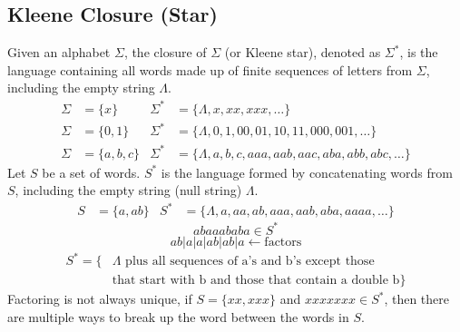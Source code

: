 \subsection{Kleene Closure (Star)}
Given an alphabet \(\Sigma\), the closure of \(\Sigma\) (or Kleene star), denoted as \(\Sigma^*\), is the language containing all words made up of finite sequences of letters from \(\Sigma\), including the empty string \(\Lambda\).
\begin{align*}
    \Sigma&=\{x\} & \Sigma^*&=\{\Lambda, x, xx, xxx,\ldots\}\\
    \Sigma&=\{0,1\} & \Sigma^*&=\{\Lambda,0,1,00,01,10,11,000,001,\ldots\}\\
    \Sigma&=\{a,b,c\} & \Sigma^*&=\{\Lambda,a,b,c,aaa,aab,aac,aba,abb,abc,\ldots\}
\end{align*}
Let \(S\) be a set of words. \(S^*\) is the language formed by concatenating words from \(S\), including the empty string (null string) \(\Lambda\).
\begin{align*}
    S&=\{a,ab\} & S^*&=\{\Lambda,a,aa,ab,aaa,aab,aba,aaaa,\ldots\}
\end{align*}
\[
    abaaababa \in S^*
\]
\[
    ab|a|a|ab|ab|a \leftarrow \text{factors}
\]
\begin{align*}
    S^*=\{&\Lambda \text{ plus all sequences of a's and b's except those}\\
    &\text{that start with b and those that contain a double b}\}
\end{align*}
Factoring is not always unique, if \(S=\{xx,xxx\}\) and \(xxxxxxx \in S^*\), then there are multiple ways to break up the word between the words in \(S\).